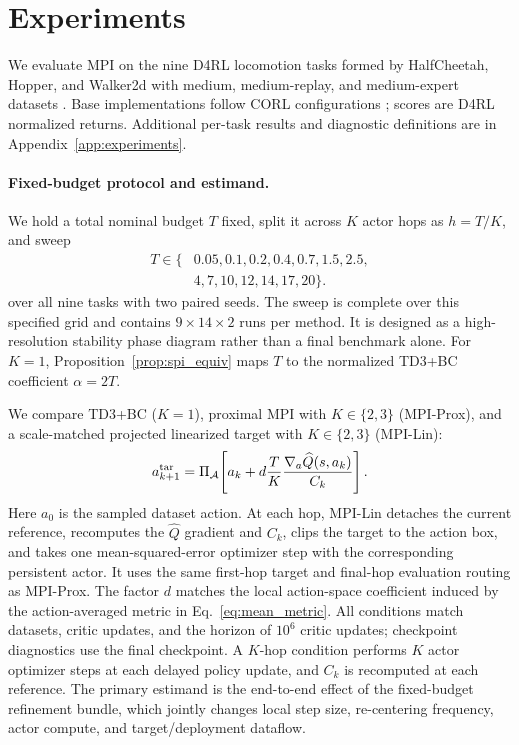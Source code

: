 \section{Experiments}
\label{sec:experiments}

We evaluate MPI on the nine D4RL locomotion tasks formed by HalfCheetah,
Hopper, and Walker2d with medium, medium-replay, and medium-expert datasets
\citep{fu2020d4rl}. Base implementations follow CORL configurations
\citep{tarasov2022corl}; scores are D4RL normalized returns. Additional
per-task results and diagnostic definitions are in
Appendix~\ref{app:experiments}.

\paragraph{Fixed-budget protocol and estimand.}
We hold a total nominal budget $T$ fixed, split it across $K$ actor hops as
$h=T/K$, and sweep
\begin{equation*}
\begin{split}
T\in\{&0.05,0.1,0.2,0.4,0.7,1.5,2.5,\\
      &4,7,10,12,14,17,20\}.
\end{split}
\end{equation*}
over all nine tasks with two paired seeds. The sweep is complete over this
specified grid and contains $9\times14\times2$ runs per method. It is designed
as a high-resolution stability phase diagram rather than a final benchmark
alone. For $K=1$, Proposition~\ref{prop:spi_equiv} maps $T$ to the normalized
TD3+BC coefficient $\alpha=2T$.

We compare TD3+BC ($K=1$), proximal MPI with $K\in\{2,3\}$ (MPI-Prox), and a
scale-matched projected linearized target with $K\in\{2,3\}$ (MPI-Lin):
\begin{equation}
 a_{k+1}^{\rm tar}=\Pi_{\mathcal A}\!\left[
 a_k+d\frac{T}{K}\frac{\nabla_a\widehat Q(s,a_k)}{C_k}\right].
 \label{eq:linearized_target}
\end{equation}
Here $a_0$ is the sampled dataset action. At each hop, MPI-Lin detaches the
current reference, recomputes the $\widehat Q$ gradient and $C_k$, clips the
target to the action box, and takes one mean-squared-error optimizer step with
the corresponding persistent actor. It uses the same first-hop target and
final-hop evaluation routing as MPI-Prox. The factor $d$ matches the local
action-space coefficient induced by the action-averaged metric in
Eq.~\eqref{eq:mean_metric}. All conditions match datasets, critic updates, and
the horizon of $10^6$ critic updates; checkpoint diagnostics use the final
checkpoint. A $K$-hop condition performs $K$ actor optimizer steps at each
delayed policy update, and $C_k$ is recomputed at each reference. The primary
estimand is the end-to-end effect of the fixed-budget refinement bundle, which
jointly changes local step size, re-centering frequency, actor compute, and
target/deployment dataflow.

